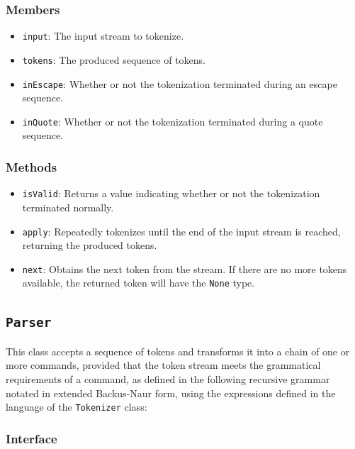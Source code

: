 \documentclass{article}
\begin{document}
  \subsubsection{Members}
  \begin{itemize}
    \item \texttt{input}: The input stream to tokenize.
    \item \texttt{tokens}: The produced sequence of tokens.
    \item \texttt{inEscape}: Whether or not the tokenization terminated
      during an escape sequence.
    \item \texttt{inQuote}: Whether or not the tokenization terminated
      during a quote sequence.
  \end{itemize}

  \subsubsection{Methods}
  \begin{itemize}
    \item \texttt{isValid}: Returns a value indicating whether or not
      the tokenization terminated normally.
    \item \texttt{apply}: Repeatedly tokenizes until the end of the
      input stream is reached, returning the produced tokens.
    \item \texttt{next}: Obtains the next token from the stream.  If
      there are no more tokens available, the returned token will have
      the \texttt{None} type.
  \end{itemize}

  \subsection{\texttt{Parser}}

  This class accepts a sequence of tokens and transforms it into a chain
  of one or more commands, provided that the token stream meets the
  grammatical requirements of a command, as defined in the following
  recursive grammar notated in extended Backus-Naur form, using the
  expressions defined in the language of the \texttt{Tokenizer} class:

  

  \subsubsection{Interface}
  
\end{document}
